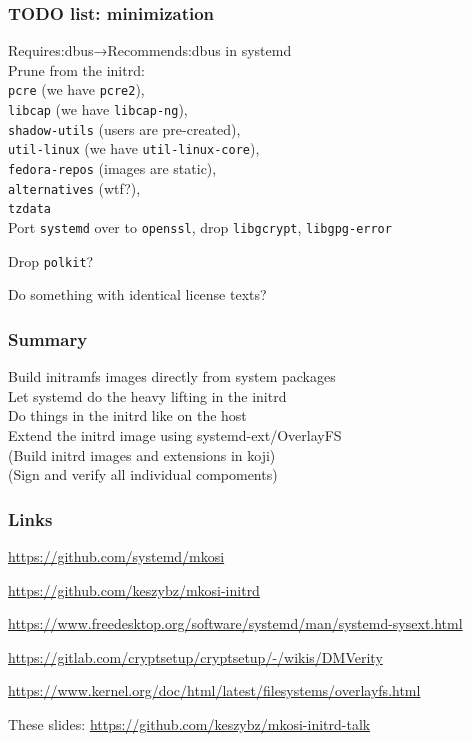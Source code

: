 \documentclass[]{beamer}
\begin{document}
\begin{frame}
  \frametitle{TODO list: minimization}

  Requires:dbus→Recommends:dbus in systemd\\

  Prune from the initrd:\\
  \texttt{pcre} (we have \texttt{pcre2}),\\
  \texttt{libcap} (we have \texttt{libcap-ng}),\\
  \texttt{shadow-utils} (users are pre-created),\\
  \texttt{util-linux} (we have \texttt{util-linux-core}),\\
  \texttt{fedora-repos} (images are static),\\
  \texttt{alternatives} (wtf?),\\
  \texttt{tzdata}\\

  Port \texttt{systemd} over to \texttt{openssl}, drop \texttt{libgcrypt}, \texttt{libgpg-error}

  Drop \texttt{polkit}?

  Do something with identical license texts?
\end{frame}

\begin{frame}
  \frametitle{Summary}

  Build initramfs images directly from system packages\\
  Let systemd do the heavy lifting in the initrd\\
  Do things in the initrd like on the host\\
  Extend the initrd image using systemd-ext/OverlayFS\\
  (Build initrd images and extensions in koji)\\
  (Sign and verify all individual compoments)
\end{frame}

\begin{frame}[fragile]
  \frametitle{Links}

  \url{https://github.com/systemd/mkosi}

  \url{https://github.com/keszybz/mkosi-initrd}

  \url{https://www.freedesktop.org/software/systemd/man/systemd-sysext.html}

  {
    \small
    \url{https://gitlab.com/cryptsetup/cryptsetup/-/wikis/DMVerity}\\
    }

  \url{https://www.kernel.org/doc/html/latest/filesystems/overlayfs.html}

  These slides: \url{https://github.com/keszybz/mkosi-initrd-talk}

\end{frame}
\end{document}
